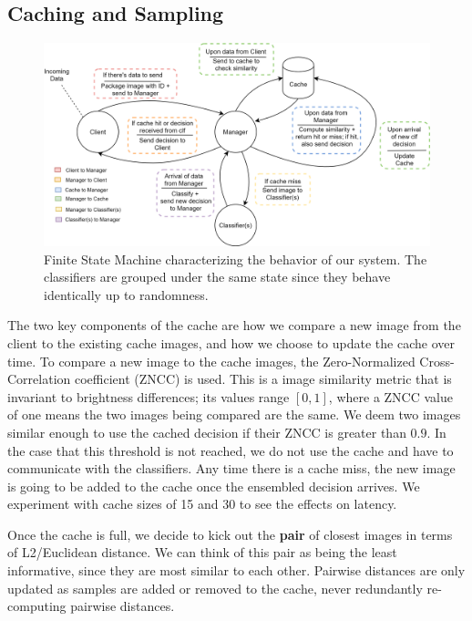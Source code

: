 \documentclass[11pt]{article}
\begin{document}
\subsection{Caching and Sampling}


\begin{figure}[t]
    \centering
    \includegraphics[scale=0.15]{FSM.png}
    \caption{Finite State Machine characterizing the behavior of our system. The classifiers are grouped under the same state since they behave identically up to randomness.}
    \label{fig:fsm}
\end{figure}

The two key components of the cache are how we compare a new image from the client to the existing cache images, and how we choose to update the cache over time. To compare a new image to the cache images, the Zero-Normalized Cross-Correlation coefficient (ZNCC) is used. This is a image similarity metric that is invariant to brightness differences; its values range $[0,1]$, where a ZNCC value of one means the two images being compared are the same. We deem two images similar enough to use the cached decision if their ZNCC is greater than $0.9$. In the case that this threshold is not reached, we do not use the cache and have to communicate with the classifiers. Any time there is a cache miss, the new image is going to be added to the cache once the ensembled decision arrives. We experiment with cache sizes of 15 and 30 to see the effects on latency. 

Once the cache is full, we decide to kick out the \textbf{pair} of closest images in terms of L2/Euclidean distance. We can think of this pair as being the least informative, since they are most similar to each other. Pairwise distances are only updated as samples are added or removed to the cache, never redundantly re-computing pairwise distances.
\end{document}
